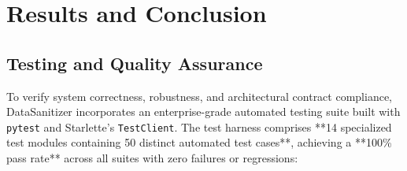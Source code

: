 \section{Results and Conclusion}

\subsection{Testing and Quality Assurance}
To verify system correctness, robustness, and architectural contract compliance, DataSanitizer incorporates an enterprise-grade automated testing suite built with \texttt{pytest} and Starlette's \texttt{TestClient}. The test harness comprises **14 specialized test modules containing 50 distinct automated test cases**, achieving a **100\% pass rate** across all suites with zero failures or regressions:

